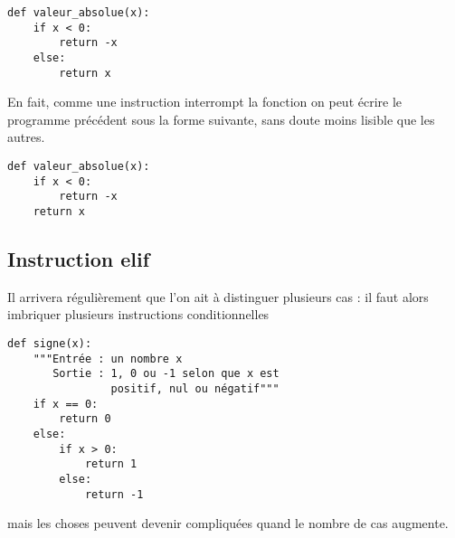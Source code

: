 \begin{lstlisting}
def valeur_absolue(x):
    if x < 0:
        return -x
    else:
        return x
\end{lstlisting}
En fait, comme une instruction  interrompt la fonction on peut écrire le programme précédent sous la forme suivante, sans doute moins lisible que les autres.
\begin{lstlisting}
def valeur_absolue(x):
    if x < 0:
        return -x
    return x
\end{lstlisting}
\subsection{Instruction elif}
Il arrivera régulièrement que l'on ait à distinguer plusieurs cas : il faut alors imbriquer plusieurs instructions conditionnelles
\begin{lstlisting}
def signe(x):
    """Entrée : un nombre x
       Sortie : 1, 0 ou -1 selon que x est 
                positif, nul ou négatif"""
    if x == 0:
        return 0
    else:
        if x > 0:
            return 1
        else:
            return -1
\end{lstlisting}
mais les choses peuvent devenir compliquées quand le nombre de cas augmente.

